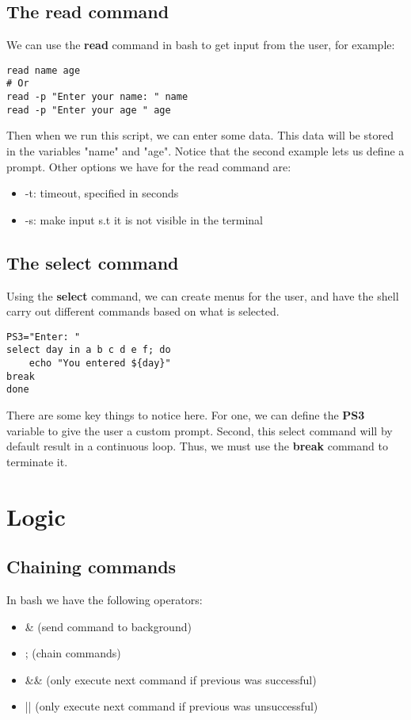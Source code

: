 \documentclass{report}
\begin{document}
  \pagebreak \bigbreak \noindent 
  \subsection{The read command}
  \bigbreak \noindent 
  We can use the \textbf{read} command in bash to get input from the user, for example:
  
  \begin{verbatim}
read name age
# Or
read -p "Enter your name: " name
read -p "Enter your age " age
  \end{verbatim}
  \bigbreak \noindent
  
  \bigbreak \noindent 
  Then when we run this script, we can enter some data. This data will be stored in the variables "name" and "age". Notice that the second example lets us define a prompt.
  \bigbreak \noindent 
  Other options we have for the read command are:
    \begin{itemize}
        \item -t: timeout, specified in seconds
        \item -s: make input s.t it is not visible in the terminal 
    \end{itemize}

    \bigbreak \noindent 
    \subsection{The select command}
    \bigbreak \noindent 
    Using the \textbf{select} command, we can create menus for the user, and have the shell carry out different commands based on what is selected. 
    
    \begin{verbatim}
PS3="Enter: "
select day in a b c d e f; do
    echo "You entered ${day}"
break
done
    \end{verbatim}
    \bigbreak \noindent
    
    \bigbreak \noindent 
    There are some key things to notice here. For one, we can define the \textbf{PS3} variable to give the user a custom prompt. Second, this select command will by default result in a continuous loop. Thus, we must use the \textbf{break} command to terminate it.

    \pagebreak \bigbreak \noindent 
    \section{\LARGE Logic}
    \bigbreak \noindent 
    \subsection{Chaining commands} 
    \bigbreak \noindent 
    In bash we have the following operators:
    \begin{itemize}
        \item \& (send command to background)
        \item ; (chain commands)
        \item \&\& (only execute next command if previous was successful)
        \item || (only execute next command if previous was unsuccessful)
    \end{itemize}
\end{document}
